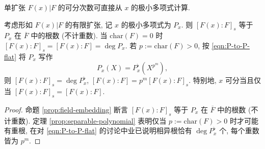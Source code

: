 单扩张 $F(x)|F$ 的可分次数可直接从 $x$ 的极小多项式计算.
\begin{lemma}\label{prop:field-sdegree-F(x)}
	考虑形如 $F(x)|F$ 的有限扩张, 记 $x$ 的极小多项式为 $P_x$. 则 $[F(x):F]_s$ 等于 $P_x$ 在 $\overline{F}$ 中的根数 (不计重数). 当 $\mathrm{char}(F)=0$ 时 $[F(x):F]_s = [F(x):F] = \deg P_x$. 若 $p := \mathrm{char}(F) > 0$, 按 \eqref{eqn:P-to-P-flat} 将 $P_x$ 写作
	\[ P_x(X) = P^\flat_x\left( X^{p^m} \right), \]
	则 $[F(x):F]_s = \deg P^\flat_x$, $[F(x):F] = p^m [F(x):F]_s$. 特别地, $x$ 可分当且仅当 $[F(x):F]_s = [F(x):F]$.
\end{lemma}
\begin{proof}
	命题 \ref{prop:field-embedding} 断言 $[F(x):F]_s$ 等于 $P_x$ 在 $\overline{F}$ 中的根数 (不计重数). 定理 \ref{prop:separable-polynomial} 表明仅当 $p := \mathrm{char}(F) > 0$ 时才可能有重根, 在对 \eqref{eqn:P-to-P-flat} 的讨论中业已说明相异根恰有 $\deg P^\flat_x$ 个, 每个重数皆为 $p^m$.
\end{proof}

